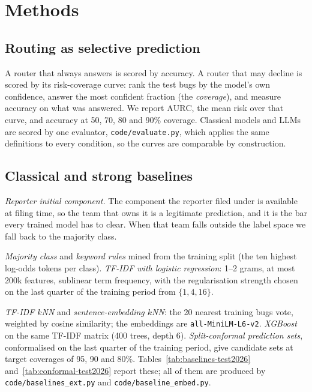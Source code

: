 \documentclass[sigconf,anonymous]{acmart}
\begin{document}
\section{Methods}
\label{sec:methods}


\subsection{Routing as selective prediction}
A router that always answers is scored by accuracy. A router that may decline is scored by its
risk-coverage curve: rank the test bugs by the model's own confidence, answer the most confident
fraction (the \emph{coverage}), and measure accuracy on what was answered. We report
$\mathrm{AURC}$, the mean risk over that curve, and accuracy at 50, 70, 80 and 90\% coverage.
Classical models and LLMs are scored by one evaluator, \texttt{code/evaluate.py}, which applies the
same definitions to every condition, so the curves are comparable by construction.

\subsection{Classical and strong baselines}
\emph{Reporter initial component.} The component the reporter filed under is available at filing
time, so the team that owns it is a legitimate prediction, and it is the bar every trained model
has to clear. When that team falls outside the label space we fall back to the majority class.

\emph{Majority class} and \emph{keyword rules} mined from the training split (the ten highest
log-odds tokens per class). \emph{TF-IDF with logistic regression}: 1--2 grams, at most 200k
features, sublinear term frequency, with the regularisation strength chosen on the last quarter of
the training period from $\{1,4,16\}$.

\emph{TF-IDF $k$NN} and \emph{sentence-embedding $k$NN}: the 20 nearest training bugs vote,
weighted by cosine similarity; the embeddings are \texttt{all-MiniLM-L6-v2}. \emph{XGBoost} on the
same TF-IDF matrix (400 trees, depth 6). \emph{Split-conformal prediction sets}, conformalised on
the last quarter of the training period, give candidate sets at target coverages of 95, 90 and
80\%. Tables~\ref{tab:baselines-test2026} and~\ref{tab:conformal-test2026} report these; all of
them are produced by \texttt{code/baselines\_ext.py} and \texttt{code/baseline\_embed.py}.
\end{document}
